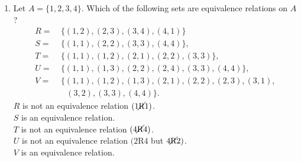 \documentclass{article}
\begin{document}
\begin{enumerate}
\begin{proof}
\begin{enumerate}[i.]
                    \item \lQuote $(A \times B) \cap (A \times C) \subseteq A \times (B \cap C)$" means:
                        \begin{align*}
                            \lQuote \text{For all } z \in (A \times B) \cap (A \times C)\text{, } z \in A \times (B \cap C)\text{."}
                        \end{align*}

                        To prove this, we must fix an arbitrary $z \in (A \times B) \cap (A \times C)$. Therefore, $z \in (A \times B)$ and $z \in (A \times C)$. Then, $z = (x, y)$, $x \in A$ and $y \in B$ and $x \in A$ and $y \in C$. Since $y \in B$ and $y \in C$, $y \in (B \cap C)$. Since $x \in A$ and $y \in (B \cap C)$,
                        \begin{alignat*}{2}
                            &z = (x,y) \in A \times (B \cap C) \text{ and} \\
                            &z \in A \times (B \cap C)\text{.}
                        \end{alignat*}
                \end{enumerate}

                Therefore, since
                \begin{alignat*}{2}
                    &A \times (B \cap C) \subseteq (A \times B) \cap (A \times C)\text{ and} \\
                    &(A \times B) \cap (A \times C) \subseteq A \times (B \cap C)\text{, then} \\
                    &A \times (B \cap C) = (A \times B) \cap (A \times C)\text{.}
                \end{alignat*}
            \end{proof}

	\item Let $A = \{ 1, 2, 3, 4 \}$.  Which of the following sets are equivalence relations on $A$?
		\begin{align*}
			R = & \ \{ (1,2), (2,3), (3,4), (4,1) \}\\
			S = & \ \{ (1,1), (2,2), (3,3), (4,4) \}, \\
			T = & \ \{ (1,1), (1,2), (2,1), (2,2), (3,3) \}, \\
			U = & \ \{ (1,1), (1,3), (2,2), (2,4), (3,3), (4,4) \}, \\
			V = & \ \{ (1,1), (1,2), (1,3), (2,1), (2,2), (2,3), (3,1), \\
			    & \ \ \ \ (3,2), (3,3), (4,4) \}.
		\end{align*}
            $R$ is not an equivalence relation $(1 \text{\cancel{R}} 1)$. \\
            $S$ is an equivalence relation. \\
            $T$ is not an equivalence relation $(4 \text{\cancel{R}} 4)$. \\
            $U$ is not an equivalence relation $(2 \text{R} 4$ but $4 \text{\cancel{R}} 2)$. \\
            $V$ is an equivalence relation.


\end{enumerate}
\end{document}
